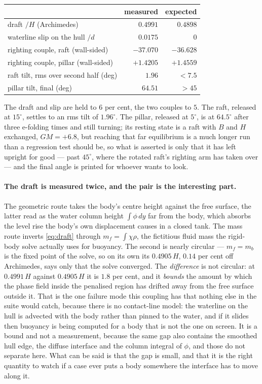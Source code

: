 \documentclass[11pt,a4paper]{article}
\begin{document}
\begin{center}\small
\begin{tabular}{lrr}
\toprule
 & measured & expected \\
\midrule
draft $/H$ (Archimedes)                  & $0.4991$   & $0.4898$ \\
waterline slip on the hull $/d$          & $0.0175$   & $0$ \\
righting couple, raft (wall-sided)       & $-37.070$  & $-36.628$ \\
righting couple, pillar (wall-sided)     & $+1.4205$  & $+1.4559$ \\
raft tilt, rms over second half (deg)    & $1.96$     & $<7.5$ \\
pillar tilt, final (deg)                 & $64.51$    & $>45$ \\
\bottomrule
\end{tabular}
\end{center}

\noindent The draft and slip are held to $6$ per cent, the two couples to $5$.
The raft, released at $15^\circ$, settles to an rms tilt of $1.96^\circ$. The
pillar, released at $5^\circ$, is at $64.5^\circ$ after three e-folding times
and still turning; its resting state is a raft with $B$ and $H$ exchanged,
$GM=+6.8$, but reaching that far equilibrium is a much longer run than a
regression test should be, so what is asserted is only that it has left upright
for good --- past $45^\circ$, where the rotated raft's righting arm has taken
over --- and the final angle is printed for whoever wants to look.

\paragraph{The draft is measured twice, and the pair is the interesting part.}
The geometric route takes the body's centre height against the free surface,
the latter read as the water column height $\int\phi\,dy$ far from the body,
which absorbs the level rise the body's own displacement causes in a closed
tank. The mass route inverts \eqref{eq:draft} through $m_f=\int\chi\rho$, the
fictitious fluid mass the rigid-body solve actually uses for buoyancy. The
second is nearly circular --- $m_f=m_b$ is the fixed point of the solve, so on
its own its $0.4905\,H$, $0.14$ per cent off Archimedes, says only that the
solve converged. The \emph{difference} is not circular: at $0.4991\,H$ against
$0.4905\,H$ it is $1.8$ per cent, and it \emph{bounds} the amount by which the
phase field inside the penalised region has drifted away from the free surface
outside it. That is the one failure mode this coupling has that nothing else in
the suite would catch, because there is no contact-line model: the waterline on
the hull is advected with the body rather than pinned to the water, and if it
slides then buoyancy is being computed for a body that is not the one on screen.
It is a bound and not a measurement, because the same gap also contains the
smoothed hull edge, the diffuse interface and the column integral of $\phi$, and
those do not separate here. What can be said is that the gap is small, and that
it is the right quantity to watch if a case ever puts a body somewhere the
interface has to move along it.
\end{document}
